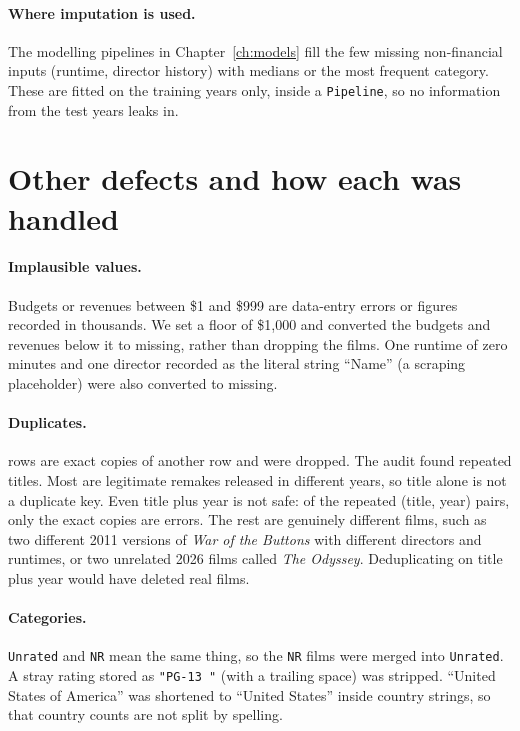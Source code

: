 \documentclass[a4paper,12pt]{report}
\newcommand{\code}[1]{\texttt{#1}}
\begin{document}
\paragraph{Where imputation is used.} The modelling pipelines in Chapter~\ref{ch:models} fill the few missing non-financial inputs (runtime, director history) with medians or the most frequent category. These are fitted on the training years only, inside a \code{Pipeline}, so no information from the test years leaks in.

\section{Other defects and how each was handled}

\paragraph{Implausible values.} Budgets or revenues between \$1 and \$999 are data-entry errors or figures recorded in thousands. We set a floor of \$1{,}000 and converted the \CleanBudgetFloored{} budgets and \CleanRevenueFloored{} revenues below it to missing, rather than dropping the films. One runtime of zero minutes and one director recorded as the literal string ``Name'' (a scraping placeholder) were also converted to missing.

\paragraph{Duplicates.} \AuditExactDuplicateRows{} rows are exact copies of another row and were dropped. The audit found \AuditDuplicatedTitles{} repeated titles. Most are legitimate remakes released in different years, so title alone is not a duplicate key. Even title plus year is not safe: of the \AuditDuplicatedTitleYear{} repeated (title, year) pairs, only the exact copies are errors. The rest are genuinely different films, such as two different 2011 versions of \emph{War of the Buttons} with different directors and runtimes, or two unrelated 2026 films called \emph{The Odyssey}. Deduplicating on title plus year would have deleted real films.

\paragraph{Categories.} \code{Unrated} and \code{NR} mean the same thing, so the \CleanContentRatingNrMerged{} \code{NR} films were merged into \code{Unrated}. A stray rating stored as \code{"PG-13~"} (with a trailing space) was stripped. ``United States of America'' was shortened to ``United States'' inside \CleanCountryRowsRenamed{} country strings, so that country counts are not split by spelling.
\end{document}
